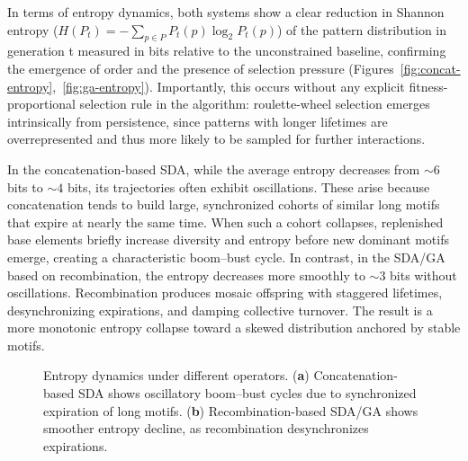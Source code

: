 \documentclass[life,article,submit,pdftex,moreauthors]{Definitions/mdpi}
\begin{document}
In terms of entropy dynamics, both systems show a clear reduction in Shannon entropy ($H(P_t) = - \sum_{p \in P} P_t(p) \log_2 P_t(p)$) of
the pattern distribution in generation t measured in bits relative to the unconstrained baseline, confirming the emergence of order and the presence of selection pressure (Figures~\ref{fig:concat-entropy},~\ref{fig:ga-entropy}). Importantly, this occurs without any explicit fitness-proportional selection rule in the algorithm: roulette-wheel selection emerges intrinsically from persistence, since patterns with longer lifetimes are overrepresented and thus more likely to be sampled for further interactions.

In the concatenation-based SDA, while the average entropy decreases from $\sim6$ bits to $\sim4$ bits, its trajectories often exhibit oscillations. These arise because concatenation tends to build large, synchronized cohorts of similar long motifs that expire at nearly the same time. When such a cohort collapses, replenished base elements briefly increase diversity and entropy before new dominant motifs emerge, creating a characteristic boom–bust cycle. In contrast, in the SDA/GA based on recombination, the entropy decreases more smoothly to $\sim3$ bits without oscillations. Recombination produces mosaic offspring with staggered lifetimes, desynchronizing expirations, and damping collective turnover. The result is a more monotonic entropy collapse toward a skewed distribution anchored by stable motifs.

\begin{figure}[H]
\centering
{}
\hfill
{}
\caption{Entropy dynamics under different operators. (\textbf{a}) Concatenation-based SDA shows oscillatory boom–bust cycles due to synchronized expiration of long motifs. (\textbf{b}) Recombination-based SDA/GA shows smoother entropy decline, as recombination desynchronizes expirations.}
\label{fig:entropy-comparison}
\end{figure}
\end{document}
